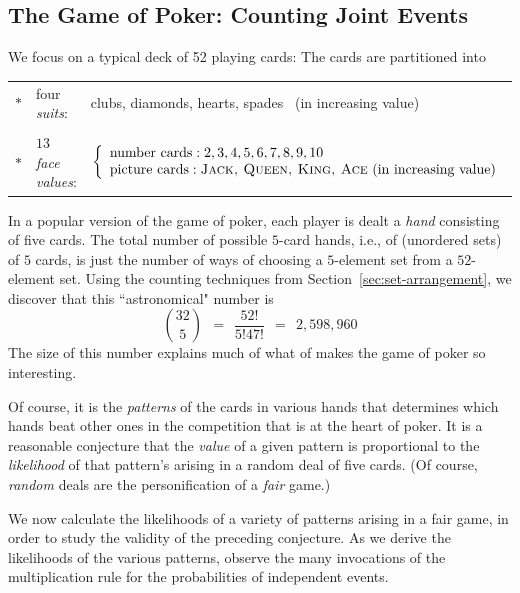 \subsection{The Game of Poker: Counting Joint Events}

We focus on a typical deck of 52 playing cards: The cards are partitioned into

\medskip

\noindent
\begin{tabular}{cll}
$*$ &
four {\em suits}:  & {\sc clubs}, {\sc diamonds}, {\sc hearts}, {\sc spades} \ (in increasing value) \\
  \\
$*$ &
$13$ {\em face values}: &
$\displaystyle \left\{
\begin{array}{l}
\mbox{number cards}: 
2, 3, 4, 5, 6, 7, 8, 9, 10 \\
\mbox{picture cards}: 
\mbox{{\sc Jack, Queen, King, Ace}  (in increasing value)}
\end{array}
\right.$ 
\end{tabular} 

\medskip

\noindent
In a popular version of the game of poker, each player is dealt a {\it hand} consisting of five cards.
The total number of possible $5$-card hands, i.e., of (unordered sets) of $5$ cards, is just the number
of ways of choosing a $5$-element set from a $52$-element set.  Using the counting techniques from
Section~\ref{sec:set-arrangement}, we discover that this ``astronomical" number is
\[
{32 \choose 5} \ \ = \ \ \frac{52!}{5! 47!} \ \ = \ \ 2,598,960 
\]
The size of this number explains much of what of makes the game of poker so interesting.

\medskip

Of course, it is the {\em patterns} of the cards in various hands that determines which hands
beat other ones in the competition that is at the heart of poker.  It is a reasonable
conjecture that the {\em value} of a given pattern is proportional to the {\em likelihood}
of that pattern's arising in a random deal of five cards.  (Of course, {\em random} deals are 
the personification of a {\em fair} game.)

We now calculate the likelihoods of a variety of patterns arising in a fair game, in order to study
the validity of the preceding conjecture.  As we derive the likelihoods of the various patterns,
observe the many invocations of the multiplication rule for the probabilities of independent events.

